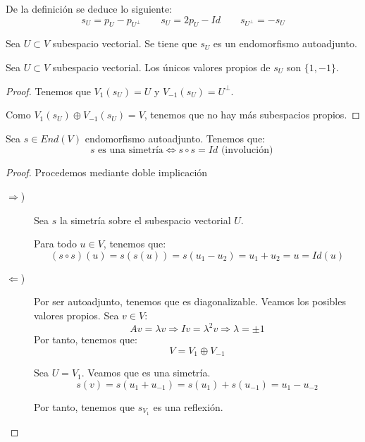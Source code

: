 De la definición se deduce lo siguiente:
\begin{equation*}
    s_U=p_U-p_{U^\perp} \qquad s_U=2p_U-Id \qquad s_{U^\perp} = -s_U
\end{equation*}

\begin{prop}
    Sea $U\subset V$ subespacio vectorial. Se tiene que $s_U$ es un endomorfismo autoadjunto.
\end{prop}

\begin{prop}
    Sea $U\subset V$ subespacio vectorial. Los únicos valores propios de $s_U$ son $\{1,-1\}$.
\end{prop}
\begin{proof}
    Tenemos que $V_1(s_U) = U$ y $V_{-1}(s_U) = U^\perp$.
    
    Como $V_1(s_U)\oplus V_{-1}(s_U) = V$, tenemos que no hay más subespacios propios.
\end{proof}

\begin{prop}
    Sea $s\in End(V)$ endomorfismo autoadjunto. Tenemos que:
    \begin{equation*}
        \text{$s$ es una simetría} \Longleftrightarrow s\circ s=Id \text{ (involución) }
    \end{equation*}
\end{prop}
\begin{proof} Procedemos mediante doble implicación
    \begin{description}
        \item [$\Longrightarrow$)]
        Sea $s$ la simetría sobre el subespacio vectorial $U$.
        
        Para todo $u\in V$, tenemos que:
        \begin{equation*}
            (s\circ s)(u)=s(s(u))=s(u_1-u_2)=u_1+u_2=u=Id(u)
        \end{equation*}

        \item [$\Longleftarrow$)] Por ser autoadjunto, tenemos que es diagonalizable. Veamos los posibles valores propios. Sea $v\in V$:
        \begin{equation*}
            Av=\lambda v \Longrightarrow Iv = \lambda ^2 v \Longrightarrow \lambda = \pm 1
        \end{equation*}
        Por tanto, tenemos que:
        \begin{equation*}
            V = V_1 \oplus V_{-1}
        \end{equation*}
               
        Sea $U=V_1$. Veamos que es una simetría.
        \begin{equation*}
            s(v) = s(u_1+u_{-1}) = s(u_1) + s(u_{-1}) = u_1 - u_{-2}
        \end{equation*}

        Por tanto, tenemos que $s_{V_1}$ es una reflexión.
    \end{description}
\end{proof}



